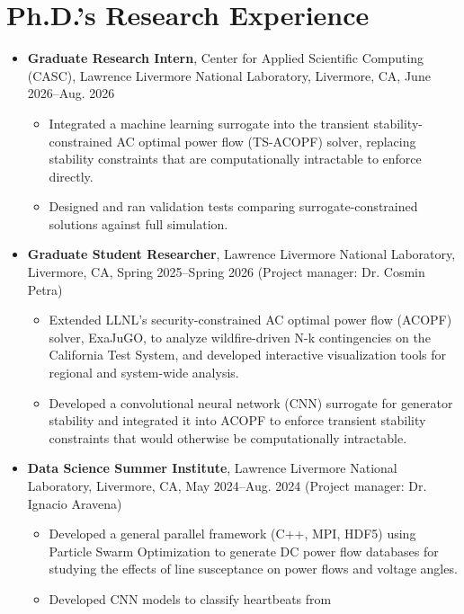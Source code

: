 \documentclass[11pt]{article}
\begin{document}
\section*{Ph.D.'s Research Experience}

\begin{itemize}
\item {\bf Graduate Research Intern}, Center for Applied Scientific
  Computing (CASC), Lawrence Livermore National Laboratory, Livermore, CA,
  June 2026--Aug. 2026
  \begin{itemize}
  \item Integrated a machine learning surrogate into the transient
    stability-constrained AC optimal power flow (TS-ACOPF) solver,
    replacing stability constraints that are computationally intractable
    to enforce directly.
  \item Designed and ran validation tests comparing surrogate-constrained
    solutions against full simulation.
  \end{itemize}
\item {\bf Graduate Student Researcher}, Lawrence Livermore National
  Laboratory, Livermore, CA, Spring 2025--Spring 2026 (Project
  manager: Dr. Cosmin Petra)
  \begin{itemize}
  \item Extended LLNL's security-constrained AC optimal power flow
    (ACOPF) solver, ExaJuGO, to analyze wildfire-driven N-k
    contingencies on the California Test System, and developed
    interactive visualization tools for regional and system-wide
    analysis.
  \item Developed a convolutional neural network (CNN) surrogate for
    generator stability and integrated it into ACOPF to enforce
    transient stability constraints that would otherwise be
    computationally intractable.
  \end{itemize}
\item {\bf Data Science Summer Institute}, Lawrence Livermore National
  Laboratory, Livermore, CA, May 2024--Aug. 2024 (Project manager:
  Dr. Ignacio Aravena)
  \begin{itemize}
  \item Developed a general parallel framework (C++, MPI, HDF5) using
    Particle Swarm Optimization to generate DC power flow databases for
    studying the effects of line susceptance on power flows and voltage
    angles.
  \item Developed CNN models to classify heartbeats from

\end{itemize}
\end{itemize}
\end{document}
